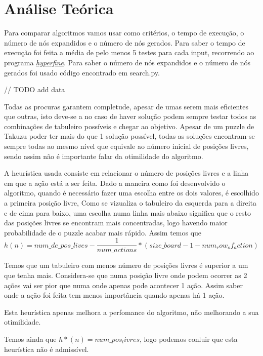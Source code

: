 \documentclass[12pt,a4paper]{article}
\begin{document}
  \section{Análise Teórica}

  Para comparar algoritmos vamos usar como critérios, o tempo de execução, o número de nós expandidos e o número de nós gerados.
  Para saber o tempo de execução foi feita a média de pelo menos 5 testes para cada input, recorrendo ao programa \href{https://github.com/sharkdp/hyperfine}{\textit{hyperfine}}.
  Para saber o número de nós expandidos e o número de nós gerados foi usado código encontrado em search.py.

  // TODO add data

  
  Todas as procuras garantem completude, apesar de umas serem mais eficientes que outras, isto deve-se a no caso de haver solução podem sempre testar todos as combinações de tabuleiro possíveis e chegar ao objetivo.
  Apesar de um puzzle de Takuzu poder ter mais do que 1 solução possível, todas as soluções encontram-se sempre todas ao mesmo nível que equivale ao número inicial de posições livres, sendo assim não é importante falar da otimilidade do algoritmo.
  
  A heurística usada consiste em relacionar o número de posições livres e a linha em que a ação está a ser feita.
  Dado a maneira como foi desenvolvido o algoritmo, quando é necessário fazer uma escolha entre os dois valores, é escolhido a primeira
  posição livre,
  Como se vizualiza o tabuleiro da esquerda para a direita e de cima para baixo, uma escolha numa linha mais abaixo significa que o resto das posições livres se encontram mais concentradas, logo havendo maior probabilidade de o puzzle acabar mais rápido.
  Assim temos que
  $$
  h(n) = {num\_de\_pos\_lives} - \frac{1}{num\_actions} * (size\_board - 1 - num_row_of_action)
  $$

  Temos que um tabuleiro com menos número de posições livres é superior a um que tenha mais.
  Considera-se que numa posição livre onde podem ocorrer as 2 ações vai ser pior que numa onde apenas pode acontecer 1 ação.
  Assim saber onde a ação foi feita tem menos importância quando apenas há 1 ação. 
  
  Esta heurística apenas melhora a perfomance do algoritmo, não melhorando a sua otimilidade. 

  Temos ainda que $h*(n) = num\_pos_livres$, logo podemos conluir que esta heurística não é admissível.
\end{document}
